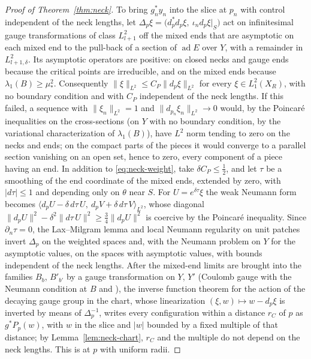 \documentclass[11pt]{amsart}
\theoremstyle{definition}
\theoremstyle{remark}
\theoremstyle{plain}
\numberwithin{equation}{section}
\newcommand{\ad}{\operatorname{ad}}
\begin{document}
\begin{proof}[Proof of Theorem~\ref{thm:neck}]
To bring $g_n^*y_n$ into the slice at $p_n$ with control independent of the neck lengths, let
$\Delta_p\xi=\bigl(d_p^*d_p\xi,\ \iota_nd_p\xi|_S\bigr)$ act on infinitesimal gauge
transformations of class $L^2_{l+1}$ off the mixed ends that are asymptotic on each mixed end to
the pull-back of a section of $\ad E$ over $Y$, with a remainder in $L^2_{l+1,\delta}$. Its
asymptotic operators are positive: on closed necks and gauge ends because the critical points
are irreducible, and on the mixed ends because $\lambda_1(B)\ge\mu_*^2$. Consequently
$\|\xi\|_{L^2}\le C_P\|d_p\xi\|_{L^2}$ for every $\xi\in L^2_1(X_R)$, with no boundary condition
and with $C_P$ independent of the neck lengths. If this failed, a sequence with
$\|\xi_n\|_{L^2}=1$ and $\|d_{p_n}\xi_n\|_{L^2}\to0$ would, by the Poincar\'e inequalities on the
cross-sections (on $Y$ with no boundary condition, by the variational characterization of
$\lambda_1(B)$), have $L^2$ norm tending to zero on the necks and ends; on the compact parts of
the pieces it would converge to a parallel section vanishing on an open set, hence to zero,
every component of a piece having an end. In addition to \eqref{eq:neck-weight}, take
$\delta C_P\le\frac12$, and let $\tau$ be a smoothing of the end coordinate of the mixed ends,
extended by zero, with $|d\tau|\le1$ and depending only on $\theta$ near $S$. For
$U=e^{\delta\tau}\xi$ the weak Neumann form becomes
$\langle d_pU-\delta\,d\tau\,U,\ d_pV+\delta\,d\tau\,V\rangle_{L^2}$, whose diagonal
$\|d_pU\|^2-\delta^2\|d\tau\,U\|^2\ge\frac34\|d_pU\|^2$ is coercive by the Poincar\'e
inequality. Since $\partial_n\tau=0$, the Lax--Milgram lemma and local Neumann regularity on unit
patches invert $\Delta_p$ on the weighted spaces and, with the Neumann problem on $Y$ for the
asymptotic values, on the spaces with asymptotic values, with bounds independent of the neck
lengths. After the mixed-end limits are brought into the families $B_b$, $B'_{b'}$ by a gauge
transformation on $Y$, $Y'$ (Coulomb gauge with the Neumann condition at $B$ and
\cite[Proposition~2.10]{DFL}), the inverse function theorem for the action of the decaying gauge
group in the chart, whose linearization $(\xi,w)\mapsto w-d_p\xi$ is inverted by means of
$\Delta_p^{-1}$, writes every configuration within a distance $r_C$ of $p$ as $g^*P_p(w)$, with
$w$ in the slice \cite[(4.7)]{DFL} and $|w|$ bounded by a fixed multiple of that distance; by
Lemma~\ref{lem:neck-chart}, $r_C$ and the multiple do not depend on the neck lengths. This is
\cite[Proposition~4.6]{DFL} at $p$ with uniform radii.


\end{proof}
\end{document}
